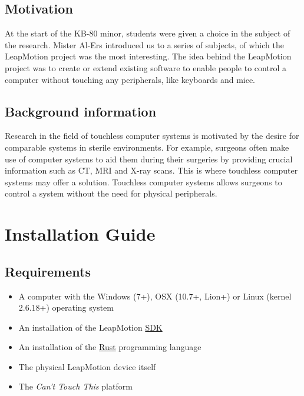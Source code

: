 \documentclass[a4paper]{article}
\providecommand{\tightlist}{%
\setlength{\itemsep}{0pt}\setlength{\parskip}{0pt}}
\begin{document}
  \subsection{Motivation}
  At the start of the KB-80 minor, students were given a choice in the subject
  of the research. Mister Al-Ers introduced us to a series of subjects, of which
  the LeapMotion project was the most interesting. The idea behind the
  LeapMotion project was to create or extend existing software to enable people
  to control a computer without touching any peripherals, like keyboards and
  mice.

  \subsection{Background information}
  Research in the field of touchless computer systems is motivated by the desire
  for comparable systems in sterile environments. For example, surgeons often
  make use of computer systems to aid them during their surgeries by providing
  crucial information such as CT, MRI and X-ray scans. This is where touchless
  computer systems may offer a solution. Touchless computer systems allows
  surgeons to control a system without the need for physical peripherals.
  \clearpage

  \section{Installation Guide}
  \subsection{Requirements}
  \begin{itemize}
    \tightlist
    \item A computer with the Windows (7+), OSX (10.7+, Lion+) or
      Linux (kernel 2.6.18+) operating system
    \item An installation of the LeapMotion
      \href{https://developer.leapmotion.com/sdk/v2}{SDK}
    \item An installation of the
      \href{https://rust-lang.org}{Rust} programming language
    \item The physical LeapMotion device itself
    \item The \textit{Can't Touch This} platform
  \end{itemize}
\end{document}
